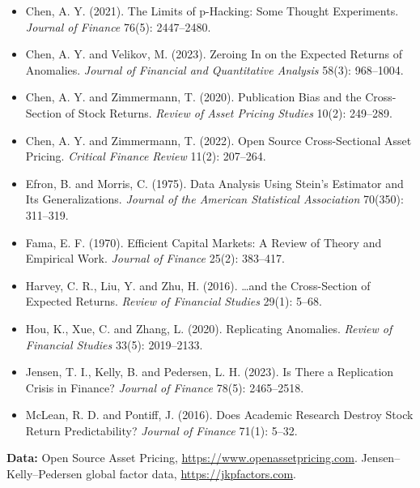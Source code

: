 \begin{itemize}
  \item Chen, A. Y. (2021). The Limits of p-Hacking: Some Thought Experiments. \emph{Journal of Finance} 76(5): 2447--2480.
  \item Chen, A. Y. and Velikov, M. (2023). Zeroing In on the Expected Returns of Anomalies. \emph{Journal of Financial and Quantitative Analysis} 58(3): 968--1004.
  \item Chen, A. Y. and Zimmermann, T. (2020). Publication Bias and the Cross-Section of Stock Returns. \emph{Review of Asset Pricing Studies} 10(2): 249--289.
  \item Chen, A. Y. and Zimmermann, T. (2022). Open Source Cross-Sectional Asset Pricing. \emph{Critical Finance Review} 11(2): 207--264.
  \item Efron, B. and Morris, C. (1975). Data Analysis Using Stein's Estimator and Its Generalizations. \emph{Journal of the American Statistical Association} 70(350): 311--319.
  \item Fama, E. F. (1970). Efficient Capital Markets: A Review of Theory and Empirical Work. \emph{Journal of Finance} 25(2): 383--417.
  \item Harvey, C. R., Liu, Y. and Zhu, H. (2016). \ldots and the Cross-Section of Expected Returns. \emph{Review of Financial Studies} 29(1): 5--68.
  \item Hou, K., Xue, C. and Zhang, L. (2020). Replicating Anomalies. \emph{Review of Financial Studies} 33(5): 2019--2133.
  \item Jensen, T. I., Kelly, B. and Pedersen, L. H. (2023). Is There a Replication Crisis in Finance? \emph{Journal of Finance} 78(5): 2465--2518.
  \item McLean, R. D. and Pontiff, J. (2016). Does Academic Research Destroy Stock Return Predictability? \emph{Journal of Finance} 71(1): 5--32.
\end{itemize}

\textbf{Data:} Open Source Asset Pricing, \url{https://www.openassetpricing.com}. Jensen--Kelly--Pedersen global factor data, \url{https://jkpfactors.com}.
